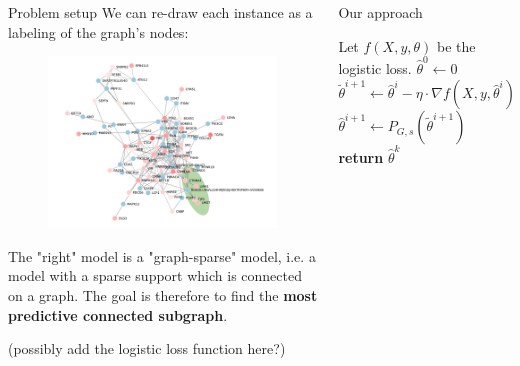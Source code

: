 \documentclass[svgnames,final]{beamer}
\newcommand{\thetatilde}{\ensuremath{\tilde{\theta}}}
\newcommand{\thetahat}{\ensuremath{\hat{\theta}}}
\begin{document}
\begin{frame}
\begin{columns}[T]
\begin{column}{.3\linewidth}
\begin{block}{Problem setup}
		We can re-draw each instance as a labeling of the graph's nodes:

		\begin{figure}[h]
		\centering
		\includegraphics[width=0.8\linewidth]{images/graph.pdf}
		\end{figure}

		The "right" model is a "graph-sparse" model, i.e. a model with a sparse support which is connected on a graph.
		The goal is therefore to find the \textbf{most predictive connected subgraph}.

		(possibly add the logistic loss function here?)

	\end{block}

	\vspace{2cm}

\end{column}

\begin{column}{.3\linewidth}

	\begin{block}{Our approach}

		\begin{algorithmic}%
		\State Let $f(X, y, \theta)$ be the logistic loss.
		\State $\thetahat^0 \gets 0$
		\State $\thetatilde^{i+1} \gets \thetahat^i - \eta \cdot \nabla f(X, y, \thetahat^i)$
		\State $\thetahat^{i+1} \gets P_{G,s}(\thetatilde^{i+1})$ 
		\EndFor
		\State \textbf{return} $\thetahat^k$
		\EndFunction
		\end{algorithmic}



\end{block}
\end{column}
\end{columns}
\end{frame}
\end{document}
